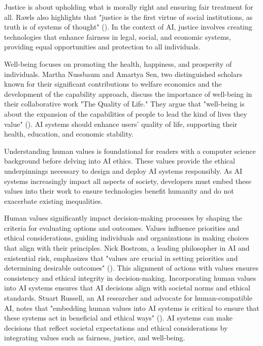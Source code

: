 \documentclass[
  letterpaper,
  numbers=noenddot,
  DIV=11,
  oneside]{scrreprt}
\theoremstyle{remark}
\begin{document}
Justice is about upholding what is morally right and ensuring fair
treatment for all. Rawls also highlights that "justice is the first
virtue of social institutions, as truth is of systems of thought"
(). In the context of AI,
justice involves creating technologies that enhance fairness in legal,
social, and economic systems, providing equal opportunities and
protection to all individuals.

Well-being focuses on promoting the health, happiness, and prosperity of
individuals. Martha Nussbaum and Amartya Sen, two distinguished scholars
known for their significant contributions to welfare economics and the
development of the capability approach, discuss the importance of
well-being in their collaborative work "The Quality of Life." They argue
that "well-being is about the expansion of the capabilities of people to
lead the kind of lives they value"
(). AI systems
should enhance users' quality of life, supporting their health,
education, and economic stability.

Understanding human values is foundational for readers with a computer
science background before delving into AI ethics. These values provide
the ethical underpinnings necessary to design and deploy AI systems
responsibly. As AI systems increasingly impact all aspects of society,
developers must embed these values into their work to ensure
technologies benefit humanity and do not exacerbate existing
inequalities.

Human values significantly impact decision-making processes by shaping
the criteria for evaluating options and outcomes. Values influence
priorities and ethical considerations, guiding individuals and
organizations in making choices that align with their principles. Nick
Bostrom, a leading philosopher in AI and existential risk, emphasizes
that "values are crucial in setting priorities and determining desirable
outcomes" ().
This alignment of actions with values ensures consistency and ethical
integrity in decision-making. Incorporating human values into AI systems
ensures that AI decisions align with societal norms and ethical
standards. Stuart Russell, an AI researcher and advocate for
human-compatible AI, notes that "embedding human values into AI systems
is critical to ensure that these systems act in beneficial and ethical
ways" (). AI systems can
make decisions that reflect societal expectations and ethical
considerations by integrating values such as fairness, justice, and
well-being.
\end{document}
